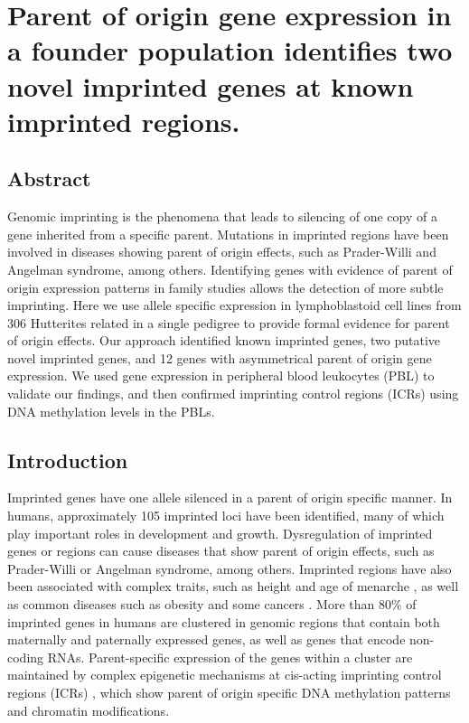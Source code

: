 \chapter{Parent of origin gene expression in a founder population identifies two novel imprinted genes at known imprinted regions.}\label{ch:imprinted}
\section[Abstract]{Abstract\footnotemark}


Genomic imprinting is the phenomena that leads to silencing of one copy of a gene inherited from a specific parent. Mutations in imprinted regions have been involved in diseases showing parent of origin effects, such as Prader-Willi and Angelman syndrome, among others. Identifying genes with evidence of parent of origin expression patterns in family studies allows the detection of more subtle imprinting. Here we use allele specific expression in lymphoblastoid cell lines from 306 Hutterites related in a single pedigree to provide formal evidence for parent of origin effects. Our approach identified known imprinted genes, two putative novel imprinted genes, and 12 genes with asymmetrical parent of origin gene expression. We used gene expression in peripheral blood leukocytes (PBL) to validate our findings, and then confirmed imprinting control regions (ICRs) using DNA methylation levels in the PBLs.



\section{Introduction}\label{ch03-introduction}
	Imprinted genes have one allele silenced in a parent of origin specific manner. In humans, approximately 105 imprinted loci have been identified, many of which play important roles in development and growth\cite{Falls1999,Peters2014}. Dysregulation of imprinted genes or regions can cause diseases that show parent of origin effects, such as Prader-Willi or Angelman syndrome, among others\cite{Peters2014}. Imprinted regions have also been associated with complex traits, such as height and age of menarche \cite{Benonisdottir:2016dz,Zoledziewska:2015do}, as well as common diseases such as obesity and some cancers \cite{Peters2014}. More than 80\% of imprinted genes in humans are clustered in genomic regions that contain both maternally and paternally expressed genes, as well as genes that encode non-coding RNAs. Parent-specific expression of the genes within a cluster are maintained by complex epigenetic mechanisms at cis-acting imprinting control regions (ICRs) \cite{Kalish:2014gd}, which show parent of origin specific DNA methylation patterns and chromatin modifications.
	
